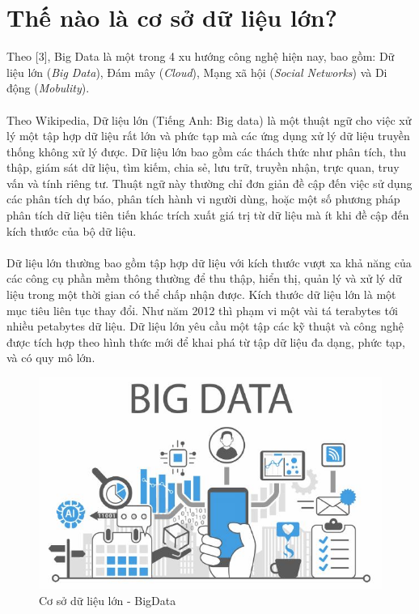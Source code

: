 \documentclass[12pt,a4paper]{report}
\begin{document}
	\section{Thế nào là cơ sở dữ liệu lớn?}
	Theo [3], Big Data là một trong 4 xu hướng công nghệ hiện nay, bao gồm: Dữ liệu lớn (\textit{Big Data}), Đám mây (\textit{Cloud}), Mạng xã hội (\textit{Social Networks}) và Di động (\textit{Mobulity}). \\\\
	Theo Wikipedia, Dữ liệu lớn (Tiếng Anh: Big data) là một thuật ngữ cho việc xử lý một tập hợp dữ liệu rất lớn và phức tạp mà các ứng dụng xử lý dữ liệu truyền thống không xử lý được. Dữ liệu lớn bao gồm các thách thức như phân tích, thu thập, giám sát dữ liệu, tìm kiếm, chia sẻ, lưu trữ, truyền nhận, trực quan, truy vấn và tính riêng tư. Thuật ngữ này thường chỉ đơn giản đề cập đến việc sử dụng các phân tích dự báo, phân tích hành vi người dùng, hoặc một số phương pháp phân tích dữ liệu tiên tiến khác trích xuất giá trị từ dữ liệu mà ít khi đề cập đến kích thước của bộ dữ liệu.\\\\
	Dữ liệu lớn thường bao gồm tập hợp dữ liệu với kích thước vượt xa khả năng của các công cụ phần mềm thông thường để thu thập, hiển thị, quản lý và xử lý dữ liệu trong một thời gian có thể chấp nhận được. Kích thước dữ liệu lớn là một mục tiêu liên tục thay đổi. Như năm 2012 thì phạm vi một vài tá terabytes tới nhiều petabytes dữ liệu. Dữ liệu lớn yêu cầu một tập các kỹ thuật và công nghệ được tích hợp theo hình thức mới để khai phá từ tập dữ liệu đa dạng, phức tạp, và có quy mô lớn.
	\begin{figure}[h]
		\centering
		\includegraphics[scale=.7]{b-1-1.jpg}
		\caption{Cơ sở dữ liệu lớn - BigData}
	\end{figure}
\end{document}
